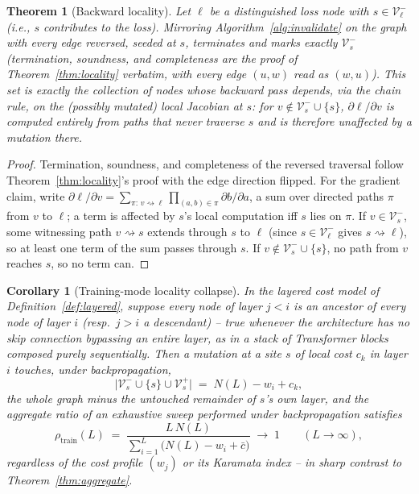 \documentclass[11pt,a4paper]{article}
\newtheorem{theorem}{Theorem}
\newtheorem{corollary}{Corollary}
\newcommand{\V}{\mathcal{V}}
\begin{document}
\begin{theorem}[Backward locality]
\label{thm:backward-locality}
Let $\ell$ be a distinguished loss node with $s \in \V_\ell^{-}$ (i.e., $s$ contributes to the
loss). Mirroring Algorithm~\ref{alg:invalidate} on the graph with every edge reversed, seeded at
$s$, terminates and marks exactly $\V_s^{-}$ (termination, soundness, and completeness are the
proof of Theorem~\ref{thm:locality} verbatim, with every edge $(u,w)$ read as $(w,u)$). This set
is exactly the collection of nodes whose backward pass depends, via the chain rule, on the
(possibly mutated) local Jacobian at $s$: for $v \notin \V_s^-\cup\{s\}$, $\partial \ell/\partial
v$ is computed entirely from paths that never traverse $s$ and is therefore unaffected by a
mutation there.
\end{theorem}

\begin{proof}
Termination, soundness, and completeness of the reversed traversal follow Theorem~\ref{thm:locality}'s
proof with the edge direction flipped. For the gradient claim, write $\partial \ell/\partial v =
\sum_{\pi:\, v\rightsquigarrow \ell} \prod_{(a,b)\in\pi} \partial b/\partial a$, a sum over
directed paths $\pi$ from $v$ to $\ell$; a term is affected by $s$'s local computation iff $s$
lies on $\pi$. If $v \in \V_s^-$, some witnessing path $v\rightsquigarrow s$ extends through $s$
to $\ell$ (since $s \in \V_\ell^-$ gives $s\rightsquigarrow\ell$), so at least one term of the sum
passes through $s$. If $v \notin \V_s^- \cup \{s\}$, no path from $v$ reaches $s$, so no term can.
\end{proof}

\begin{corollary}[Training-mode locality collapse]
\label{cor:backward-collapse}
In the layered cost model of Definition~\ref{def:layered}, suppose every node of layer $j<i$ is an
ancestor of every node of layer $i$ (resp.\ $j>i$ a descendant) -- true whenever the architecture
has no skip connection bypassing an entire layer, as in a stack of Transformer blocks composed
purely sequentially. Then a mutation at a site $s$ of local cost $c_k$ in layer $i$ touches,
under backpropagation,
\[
\big|\V_s^- \cup \{s\} \cup \V_s^+\big| \;=\; N(L) - w_i + c_k,
\]
the whole graph minus the untouched remainder of $s$'s own layer, and the aggregate ratio of an
exhaustive sweep performed \emph{under backpropagation} satisfies
\[
\rho_{\mathrm{train}}(L) \;=\; \frac{L\,N(L)}{\sum_{i=1}^{L}\big(N(L)-w_i+\bar c\big)}
\;\longrightarrow\; 1 \qquad (L\to\infty),
\]
regardless of the cost profile $(w_j)$ or its Karamata index -- in sharp contrast to
Theorem~\ref{thm:aggregate}.
\end{corollary}
\end{document}
